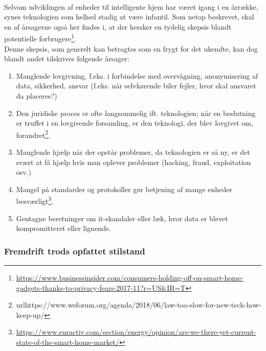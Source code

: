 \documentclass{article}
\begin{document}
\paragraph{}
Selvom udviklingen af enheder til intelligente hjem har været igang i en årrække, synes teknologien som helhed stadig at være infantil.
Som netop beskrevet, skal en af årsagerne også her findes i, at der hersker en tydelig skepsis blandt potentielle forbrugere\footnote{\url{https://www.businessinsider.com/consumers-holding-off-on-smart-home-gadgets-thanks-to-privacy-fears-2017-11?r=US\&IR=T}}.\\
Denne skepsis, som generelt kan betragtes som en frygt for det ukendte, kan dog blandt andet tilskrives følgende årsager:
\begin{enumerate}
    \item Manglende lovgivning, f.eks. i forbindelse med overvågning, anonymisering af data, sikkerhed, ansvar (f.eks. når selvkørende biler fejler, hvor skal ansvaret da placeres?)
    \item Den juridiske proces er ofte langsommelig ift. teknologien; når en beslutning er truffet i en lovgivende forsamling, er den teknologi, der blev lovgivet om, forandret\footnote{url{https://www.weforum.org/agenda/2018/06/law-too-slow-for-new-tech-how-keep-up/}}.
    \item Manglende hjælp når der opstår problemer, da teknologien er så ny, er det svært at få hjælp hvis man oplever problemer (hacking, fraud, exploitation osv.)
    \item Mangel på standarder og protokoller gør betjening af mange enheder besværligt\footnote{\url{https://www.euractiv.com/section/energy/opinion/are-we-there-yet-current-state-of-the-smart-home-market/}}.
    \item Gentagne beretninger om it-skandaler eller læk, hvor data er blevet kompromitteret eller lignende.
\end{enumerate} 
\subsubsection{Fremdrift trods opfattet stilstand}
\end{document}
